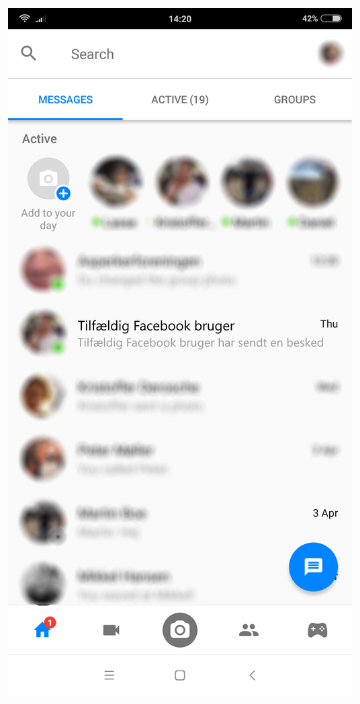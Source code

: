 \begin{figure}[H]
    \begin{subfigure}{0.33\textwidth}
        \centering
        \includegraphics[scale=0.15]{Projectdoc/Problemanalyse/Illustrationer/1-fbchat.png} 

\end{subfigure}
\end{figure}
